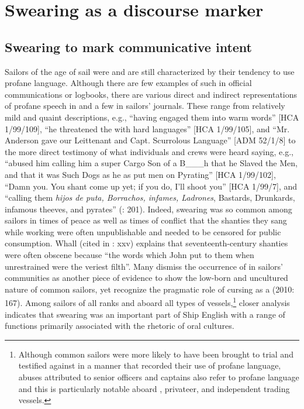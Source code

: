 \section{{Swearing as a discourse marker} }%

\subsection{{Swearing to mark communicative intent}}%

Sailors of the age of sail were and are still characterized by their tendency to use profane language. Although there are few examples of such  in official communications or logbooks, there are various direct and indirect representations of profane speech in  and a few in sailors’ journals. These range from relatively mild and quaint descriptions, e.g., “having engaged them into warm words” [HCA 1/99/109], “he threatened the  with hard languages” [HCA 1/99/105], and “Mr. Anderson gave our Leittenant and Capt. Scurrolous Language” [ADM 52/1/8] to the more direct testimony of what individuals and crews were heard saying, e.g., “abused him calling him a super Cargo Son of a B\_\_\_h that he Slaved the Men, and that it was Such Dogs as he as put men on Pyrating” [HCA 1/99/102], “Damn you. You shant come up yet; if you do, I’ll shoot you” [HCA 1/99/7], and “calling them \textit{hijos de puta, Borrachos, infames, Ladrones}, Bastards, Drunkards, infamous theeves, and pyrates” (\citealt{Gage1648}: 201). Indeed, swearing was so common among sailors in times of peace as well as times of conflict that the shanties they sang while working were often unpublishable and needed to be censored for public consumption. Whall (cited in \citealt{Palmer1986}: xxv) explains that seventeenth-century shanties were often obscene because “the words which  John put to them when unrestrained were the veriest filth”. Many dismiss the occurrence of  in sailors’ communities as another piece of evidence to show the low-born and uncultured nature of common sailors, yet \citeauthor{ClaridgeArnovick2010} recognize the pragmatic role of cursing as a  (2010: 167). Among sailors of all ranks and aboard all types of vessels,\footnote{Although common sailors were more likely to have been brought to trial and testified against in a manner that recorded their use of profane language, abuses attributed to senior officers and captains also refer to profane language and this is particularly notable aboard , privateer, and independent trading vessels.} closer analysis indicates that swearing was an important part of Ship English with a range of functions primarily associated with the rhetoric of oral cultures.


